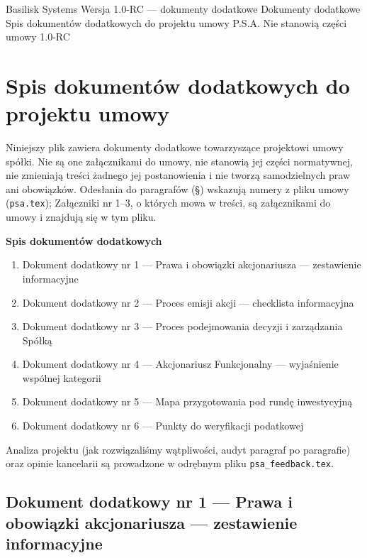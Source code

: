 \documentclass[12pt,a4paper]{report}
\newcounter{paragraf}
\begin{document}
\BusinessPlanTitlePage
  {Basilisk Systems}
  {Wersja 1.0-RC --- dokumenty dodatkowe}
  {Dokumenty dodatkowe}
  {Spis dokumentów dodatkowych do projektu umowy P.S.A.}
  {Nie stanowią części umowy}
  {1.0-RC}

\tableofcontents
\newpage

\chapter*{Spis dokumentów dodatkowych do projektu umowy}

Niniejszy plik zawiera dokumenty dodatkowe towarzyszące projektowi umowy spółki. Nie są one załącznikami do umowy, nie stanowią jej części normatywnej, nie zmieniają treści żadnego jej postanowienia i nie tworzą samodzielnych praw ani obowiązków. Odesłania do paragrafów (§) wskazują numery z pliku umowy (\texttt{psa.tex}); Załączniki nr 1--3, o których mowa w treści, są załącznikami do umowy i znajdują się w tym pliku.

\textbf{Spis dokumentów dodatkowych}
\begin{enumerate}
  \item Dokument dodatkowy nr 1 — Prawa i obowiązki akcjonariusza — zestawienie informacyjne
  \item Dokument dodatkowy nr 2 — Proces emisji akcji — checklista informacyjna
  \item Dokument dodatkowy nr 3 — Proces podejmowania decyzji i zarządzania Spółką
  \item Dokument dodatkowy nr 4 — Akcjonariusz Funkcjonalny — wyjaśnienie wspólnej kategorii
  \item Dokument dodatkowy nr 5 — Mapa przygotowania pod rundę inwestycyjną
  \item Dokument dodatkowy nr 6 — Punkty do weryfikacji podatkowej
\end{enumerate}

Analiza projektu (jak rozwiązaliśmy wątpliwości, audyt paragraf po paragrafie) oraz opinie kancelarii są prowadzone w odrębnym pliku \texttt{psa\_feedback.tex}.

\clearpage
\section*{Dokument dodatkowy nr 1 — Prawa i obowiązki akcjonariusza — zestawienie informacyjne}
\label{annex:obowiazki-akcjonariusza}
\end{document}
